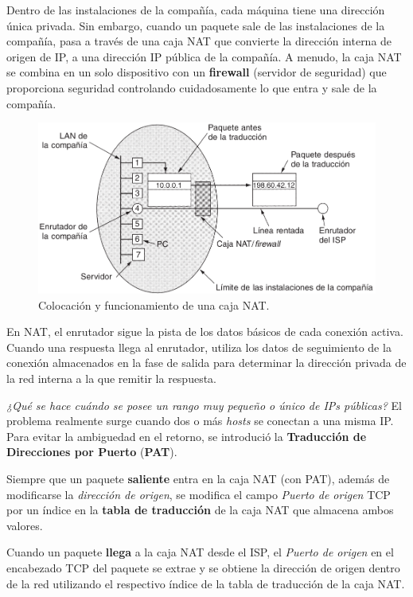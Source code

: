 \documentclass[10pt,a4paper]{article}
\begin{document}
Dentro de las instalaciones de la compañía, cada máquina tiene una dirección única privada. Sin embargo, cuando un paquete sale de las instalaciones de la compañía, pasa a través de una caja NAT que convierte la dirección interna de origen de IP, a una dirección IP pública de la compañía. A menudo, la caja NAT se combina en un solo dispositivo con un \textbf{firewall} (servidor de seguridad) que proporciona seguridad controlando cuidadosamente lo que entra y sale de la compañía.

\begin{figure}[!ht]
  \caption{Colocación y funcionamiento de una caja NAT.}
  \label{fig:nat}
  \centerline{\includegraphics[width=0.8\textwidth-\fboxrule-\fboxrule]{imgs/nat.png}}
\end{figure}

En NAT, el enrutador sigue la pista de los datos básicos de cada conexión activa. Cuando una respuesta llega al enrutador, utiliza los datos de seguimiento de la conexión almacenados en la fase de salida para determinar la dirección privada de la red interna a la que remitir la respuesta.

\textit{¿Qué se hace cuándo se posee un rango muy pequeño o único de IPs públicas?} El problema realmente surge cuando dos o más \textit{hosts} se conectan a una misma IP. Para evitar la ambiguedad en el retorno, se introdució la \textbf{Traducción de Direcciones por Puerto} (\textbf{PAT}).

Siempre que un paquete \textbf{saliente} entra en la caja NAT (con PAT), además de modificarse la \textit{dirección de origen}, se modifica el campo \textit{Puerto de origen} TCP por un índice en la \textbf{tabla de traducción} de la caja NAT que almacena ambos valores.

Cuando un paquete \textbf{llega} a la caja NAT desde el ISP, el \textit{Puerto de origen} en el encabezado TCP del paquete se extrae y se obtiene la dirección de origen dentro de la red utilizando el respectivo índice de la tabla de traducción de la caja NAT.
\end{document}
